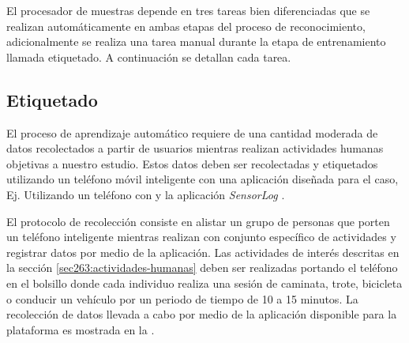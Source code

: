 El procesador de muestras depende en tres tareas bien diferenciadas
que se realizan automáticamente en ambas etapas del proceso de reconocimiento,
adicionalmente se realiza una tarea manual durante la etapa de entrenamiento
llamada etiquetado. A continuación se detallan cada tarea.

\subsection{Etiquetado}

\label{ssec44:labeling}El proceso de aprendizaje automático requiere
de una cantidad moderada de datos recolectados a partir de usuarios
mientras realizan actividades humanas objetivas a nuestro estudio.
Estos datos deben ser recolectadas y etiquetados utilizando un teléfono
móvil inteligente con una aplicación diseñada para el caso, Ej. Utilizando
un teléfono con  y la aplicación \emph{SensorLog} \cite{Alan2014s}. 

El protocolo de recolección consiste en alistar un grupo de personas
que porten un teléfono inteligente mientras realizan con conjunto
específico de actividades y registrar datos por medio de la aplicación.
Las actividades de interés descritas en la sección \ref{sec263:actividades-humanas}
deben ser realizadas portando el teléfono en el bolsillo donde cada
individuo realiza una sesión de caminata, trote, bicicleta o conducir
un vehículo por un periodo de tiempo de 10 a 15 minutos. La recolección
de datos llevada a cabo por medio de la aplicación disponible para
la plataforma  es mostrada en la . 

